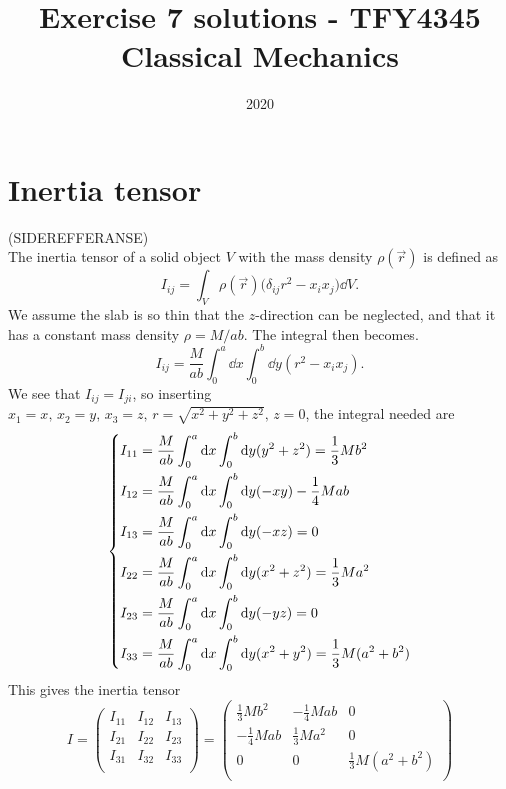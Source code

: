 \documentclass{article}
\title{Exercise 7 solutions - TFY4345 Classical Mechanics}
\date{2020}
\begin{document}
    \maketitle
    \section{Inertia tensor}
        (SIDEREFFERANSE)\\
        The inertia tensor of a solid object $V$ with the mass density $\rho(\vec r)$ is defined as
        \begin{equation*}
            I_{ij} = \int_V \rho(\vec{r}) \big(\delta_{ij} r^2 - x_ix_j) \dd V.
        \end{equation*}
        We assume the slab is so thin that the $z$-direction can be neglected, and that it has a constant mass density $\rho = M / ab$. The integral then becomes.
        \begin{equation*}
            I_{ij} = \frac{M}{ab} \int_0^a \dd x \int_0^b \dd y ( r^2 - x_ix_j).
        \end{equation*}
        We see that $I_{ij} = I_{ji}$, so inserting $x_1 = x, \, x_2 = y, \, x_3 = z, \, r = \sqrt{x^2 + y^2 + z^2}, \, z = 0$, the integral needed are
        \begin{equation*}
            \begin{dcases}
                I_{1 1} = \frac{M}{ab} \int_0^a \dd x \int_0^b \dd y (y^2 + z^2) = \frac{1}{3}Mb^2\\
                I_{1 2} = \frac{M}{ab} \int_0^a \dd x \int_0^b \dd y (-xy) -\frac{1}{4}M ab\\
                I_{1 3} = \frac{M}{ab} \int_0^a \dd x \int_0^b \dd y (-xz) = 0\\
                I_{2 2} = \frac{M}{ab} \int_0^a \dd x \int_0^b \dd y (x^2 + z^2) = \frac{1}{3}Ma^2\\
                I_{2 3} = \frac{M}{ab} \int_0^a \dd x \int_0^b \dd y (-yz) = 0\\
                I_{3 3} = \frac{M}{ab} \int_0^a \dd x \int_0^b \dd y (x^2 + y^2) = \frac{1}{3}M(a^2 + b^2)\\
            \end{dcases}    
        \end{equation*}
        This gives the inertia tensor
        \begin{equation*}
            I = \begin{pmatrix}
                I_{11} & I_{12} & I_{13} \\
                I_{21} & I_{22} & I_{23} \\
                I_{31} & I_{32} & I_{33} \\
            \end{pmatrix}
            =
            \begin{pmatrix}
                \frac{1}{3}Mb^2 & -\frac{1}{4}Mab & 0 \\
                -\frac{1}{4}Mab & \frac{1}{3}Ma^2 & 0 \\
                0 & 0 & \frac{1}{3}M(a^2 + b^2)   \\
            \end{pmatrix}
        \end{equation*}
\end{document}
